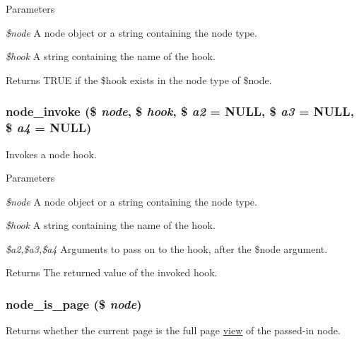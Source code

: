 \begin{DoxyParams}{Parameters}
\item[{\em \$node}]A node object or a string containing the node type. \item[{\em \$hook}]A string containing the name of the hook.\end{DoxyParams}
\begin{DoxyReturn}{Returns}
TRUE if the \$hook exists in the node type of \$node. 
\end{DoxyReturn}
\hypertarget{node_8module_a1902c3061c34578c266d8171644b18f0}{
\subsubsection[{node\_\-invoke}]{\setlength{\rightskip}{0pt plus 5cm}node\_\-invoke (\$ {\em node}, \/  \$ {\em hook}, \/  \$ {\em a2} = {\ttfamily NULL}, \/  \$ {\em a3} = {\ttfamily NULL}, \/  \$ {\em a4} = {\ttfamily NULL})}}
\label{node_8module_a1902c3061c34578c266d8171644b18f0}
Invokes a node hook.


\begin{DoxyParams}{Parameters}
\item[{\em \$node}]A node object or a string containing the node type. \item[{\em \$hook}]A string containing the name of the hook. \item[{\em \$a2,\$a3,\$a4}]Arguments to pass on to the hook, after the \$node argument.\end{DoxyParams}
\begin{DoxyReturn}{Returns}
The returned value of the invoked hook. 
\end{DoxyReturn}
\hypertarget{node_8module_ad026ffabfa7f044686789dae126d99a9}{
\subsubsection[{node\_\-is\_\-page}]{\setlength{\rightskip}{0pt plus 5cm}node\_\-is\_\-page (\$ {\em node})}}
\label{node_8module_ad026ffabfa7f044686789dae126d99a9}
Returns whether the current page is the full page \hyperlink{classview}{view} of the passed-\/in node.


